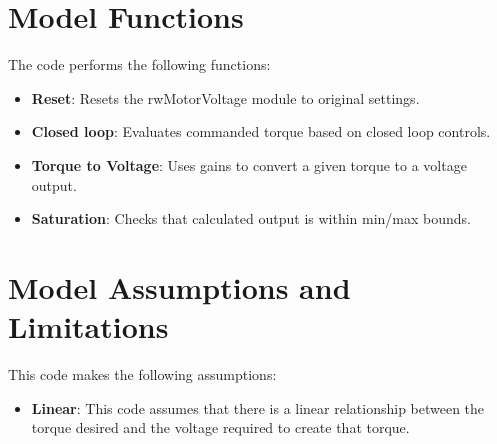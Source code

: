 \section{Model Functions}
The code performs the following functions:
\begin{itemize}
	\item \textbf{Reset}: Resets the rwMotorVoltage module to original settings.
	\item \textbf{Closed loop}: Evaluates commanded torque based on closed loop controls.
	\item \textbf{Torque to Voltage}: Uses gains to convert a given torque to a voltage output.
	\item \textbf{Saturation}:  Checks that calculated output is within min/max bounds.
\end{itemize}


\section{Model Assumptions and Limitations}
This code makes the following assumptions:
\begin{itemize}
	\item \textbf{Linear}: This code assumes that there is a linear relationship between the torque desired and the voltage required to create that torque.
\end{itemize}